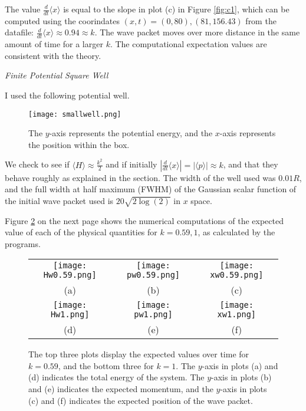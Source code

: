 The value $\frac{d}{dt} \langle x \rangle$ is equal to the slope in plot (c)
in Figure \ref{fig:c1}, which can be computed using the coorindates $(x, t)
= (0, 80), (81, 156.43)$ from the datafile: $\frac{d}{dt} \langle x \rangle
\approx 0.94 \approx k$. The wave packet moves over more distance in the
same amount of time for a larger $k$. The computational expectation values
are consistent with the theory.

\pagebreak

\begin{center}
    \textit{Finite Potential Square Well}
\end{center}

I used the following potential well.

\begin{figure}[H]
    \centering
    \texttt{[image: smallwell.png]}
    \caption[Small Potential Well]{The $y$-axis represents the potential
    energy, and the $x$-axis represents the position within the box.}
    \label{fig:smallwell}
\end{figure}

We check to see if $\langle H \rangle \approx \frac{k^2}{2}$ and if
initially $\left| \frac{d}{dt} \langle x \rangle \right| = \left| \langle p
\rangle \right| \approx k$, and that they behave roughly as explained in the
 section. The width of the well used was $0.01R$, and
the full width at half maximum (FWHM) of the Gaussian scalar function of the
initial wave packet used is $20\sqrt{2\log(2)}$ in $x$ space.

Figure \ref{fig:w} on the next page shows the numerical computations of the
expected value of each of the physical quantities for $k = 0.59, 1$, as
calculated by the programs.

\begin{figure}[H]
    \centering
    \begin{tabular}{ccc}
        \texttt{[image: Hw0.59.png]}
        &
        \texttt{[image: pw0.59.png]}
        &
        \texttt{[image: xw0.59.png]}
        \\
        (a) & (b) & (c)
        \\
        \texttt{[image: Hw1.png]}
        &
        \texttt{[image: pw1.png]}
        &
        \texttt{[image: xw1.png]}
        \\
        (d) & (e) & (f)
    \end{tabular}
    \caption[Expected Values for a Large Well for $k = 0.59, 1$]{The top
    three plots display the expected values over time for
    $k = 0.59$, and the bottom three for $k = 1$. The $y$-axis in plots (a)
    and (d) indicates the total energy of the system. The $y$-axis in plots
    (b) and (e) indicates the expected momentum, and the $y$-axis in plots
    (c) and (f) indicates the expected position of the wave packet.}
    \label{fig:w}
\end{figure}

